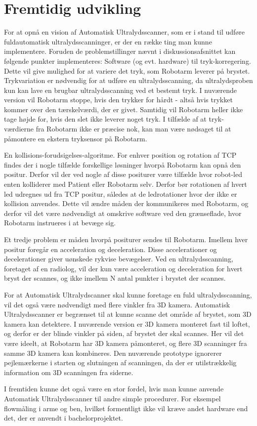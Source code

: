 \chapter{Fremtidig udvikling}\label{kapitel_Fremtidig udvikling}
For at opnå en vision af Automatisk Ultralydsscanner, som er i stand til udføre fuldautomatisk ultralydsscanninger, er der en række ting man kunne implementere. Foruden de problemstillinger nævnt i diskussionsafsnittet kan følgende punkter implementeres:
Software (og evt. hardware) til tryk-korregering. Dette vil give mulighed for at variere det tryk, som Robotarm leverer på brystet. Trykvariation er nødvendig for at udføre en ultralydsscanning, da ultralydsproben kun kan lave en brugbar ultralydsscanning ved et bestemt tryk. I nuværende version vil Robotarm stoppe, hvis den trykker for hårdt - altså hvis trykket kommer over den tærskelværdi, der er givet. Samtidig vil Robotarm heller ikke tage højde for, hvis den slet ikke leverer noget tryk. I tilfælde af at tryk-værdierne fra Robotarm ikke er præcise nok, kan man være nødsaget til at påmontere en ekstern tryksensor på Robotarm.

En kollisions-forudsigelses-algoritme. For enhver position og rotation af TCP findes der i nogle tilfælde forskellige løsninger hvorpå Robotarm kan opnå den positur. Derfor vil der ved nogle af disse positurer være tilfælde hvor robot-led enten kolliderer med Patient eller Robotarm selv. Derfor bør rotationen af hvert led udregnes ud fra TCP positur, således at de ledrotationer hvor der ikke er kollision anvendes. Dette vil ændre måden der kommunikeres med Robotarm, og derfor vil det være nødvendigt at omskrive software ved den grænseflade, hvor Robotarm instrueres i at bevæge sig.

Et tredje problem er måden hvorpå positurer sendes til Robotarm. Imellem hver positur foregår en acceleration og deceleration. Disse accelerationer og decelerationer giver uønskede rykvise bevægelser. Ved en ultralydsscanning, foretaget af en radiolog, vil der kun være acceleration og deceleration for hvert bryst der scannes, og ikke imellem N antal punkter i brystet der scannes.

For at Automatisk Ultralydscanner skal kunne foretage en fuld ultralydsscanning, vil det også være nødvendigt med flere vinkler fra 3D kamera. Automatisk Ultralydsscanner er begrænset til at kunne scanne det område af brystet, som 3D kamera kan detektere. I nuværende version er 3D kamera monteret fast til loftet, og derfor er der blinde vinkler på siden, af brystet der skal scannes. Her vil det være ideelt, at Robotarm har 3D kamera påmonteret, og flere 3D scanninger fra samme 3D kamera kan kombineres. Den nuværende prototype ignorerer pejlemærkerne i starten og slutningen af scanningen, da der er utilstrækkelig information om 3D scanningen fra siderne.

I fremtiden kunne det også være en stor fordel, hvis man kunne anvende Automatisk Ultralydsscanner til andre simple procedurer. For eksempel flowmåling i arme og ben, hvilket formentligt ikke vil kræve andet hardware end det, der er anvendt i bachelorprojektet.